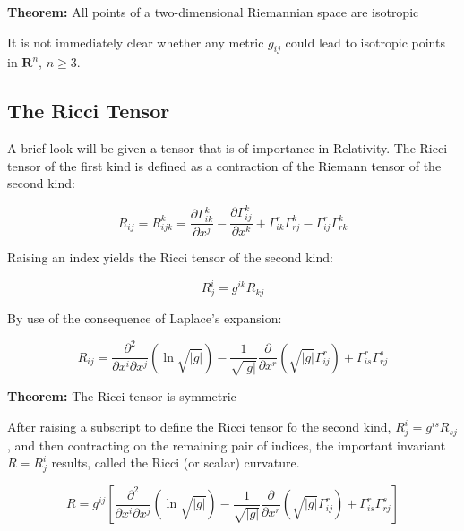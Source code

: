 \documentclass{article}
\begin{document}
\noindent \textbf{Theorem: }
All points of a two-dimensional Riemannian space are isotropic

It is not immediately clear whether any metric $g_{ij}$ could lead to isotropic points in $\mathbf{ R }^n$, $n \geq 3$.


\subsection{The Ricci Tensor}

A brief look will be given a tensor that is of importance in Relativity.  The Ricci tensor of the first kind is defined as a contraction of the Riemann tensor of the second kind:

\begin{equation}
	R_{ij} = R^k_{ijk} = \frac{ \partial \Gamma^k_{ik} }{ \partial x^j } - \frac{ \partial \Gamma^k_{ij} }{ \partial x^k } + \Gamma^r_{ik} \Gamma^k_{rj} - \Gamma^r_{ij} \Gamma^k_{rk}
\end{equation}

\noindent Raising an index yields the Ricci tensor of the second kind:

\begin{equation}
	R^i_j = g^{ik} R_{kj}
\end{equation}

By use of the consequence of Laplace's expansion:

\begin{equation}
	R_{ij} = \frac{ \partial^2 }{ \partial x^i \partial x^j }(\ln{ \sqrt{ |g| } }) - \frac{ 1 }{ \sqrt{ |g| } } \frac{ \partial }{ \partial x^r } (\sqrt{ |g| } \Gamma^r_{ij}) + \Gamma^r_{is} \Gamma^s_{rj}
\end{equation}

\noindent \textbf{Theorem: }
The Ricci tensor is symmetric

After raising a subscript to define the Ricci tensor fo the second kind, $R^i_j = g^{is} R_{sj}$, and then contracting on the remaining pair of indices, the important invariant $R = R^i_j$ results, called the Ricci (or scalar) curvature.

\begin{equation}
	R = g^{ij} \left[ \frac{ \partial^2 }{ \partial x^i \partial x^j }(\ln{ \sqrt{ |g| } }) - \frac{ 1 }{ \sqrt{ |g| } } \frac{ \partial }{ \partial x^r } (\sqrt{ |g| } \Gamma^r_{ij}) + \Gamma^r_{is} \Gamma^s_{rj} \right]
\end{equation}
\end{document}
